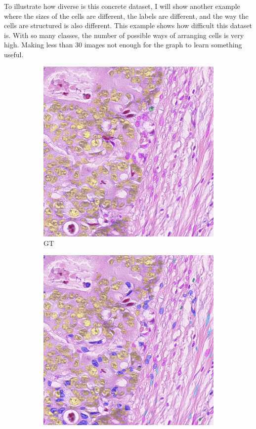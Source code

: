 To illustrate how diverse is this concrete dataset, I will show another example where the sizes of the cells are different, the labels are different, and the way the cells are structured is also different. This example shows how difficult this dataset is. With so many classes, the number of possible ways of arranging cells is very high. Making less than 30 images not enough for the graph to learn something useful. 

\begin{figure}[H]
  \centering
  \begin{subfigure}[b]{0.45\textwidth}
    \includegraphics[width=\textwidth]{imgs/qual/consep/gt2.overlay.png}
    \caption{GT}
  \end{subfigure}
  \hfill
  \begin{subfigure}[b]{0.45\textwidth}
    \includegraphics[width=\textwidth]{imgs/qual/consep/hov2.png}

\end{subfigure}
\end{figure}

